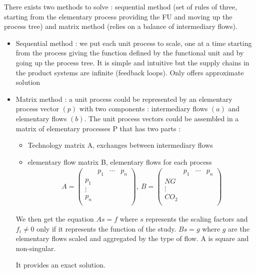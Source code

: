 \documentclass[../main.tex]{subfiles}
\begin{document}
There exists two methods to solve : sequential method (set of rules of three, starting from the elementary process providing the FU and moving up the process tree) and matrix method (relies on a balance of intermediary flows).\\

\begin{itemize}
    \item Sequential method : we put each unit process to scale, one at a time starting from the process giving the function defined by the functional unit and by going up the process tree. It is simple and intuitive but the supply chains in the product systems are infinite (feedback loops). Only offers approximate solution
    \item Matrix method : a unit process could be represented by an elementary process vector $(p)$ with two components : intermediary flows $(a)$ and elementary flows $(b)$. The unit process vectors could be assembled in a matrix of elementary processes P that has two parts : \begin{itemize}
        \item Technology matrix A, exchanges between intermediary flows
        \item elementary flow matrix B, elementary flows for each process
        \begin{equation}
            \begin{gathered}
                A = \begin{pmatrix}
                    & p_1 & \cdots & p_n\\
                    p_1 & & \\
                    \vdots & & \\
                    p_n & & \\
                \end{pmatrix}, \:
                B = \begin{pmatrix}
                    & p_1 & \cdots & p_n\\
                    NG & & \\
                    \vdots & & \\
                    CO_2 & & \\
                \end{pmatrix}
            \end{gathered}
        \end{equation}
    \end{itemize}
    We then get the equation $As = f$ where $s$ represents the scaling factors and $f_i \neq 0$ only if it represents the function of the study. $Bs = g$ where $g$ are the elementary flows scaled and aggregated by the type of flow. \warning A is square and non-singular.

    It provides an exact solution.
\end{itemize}
\end{document}
